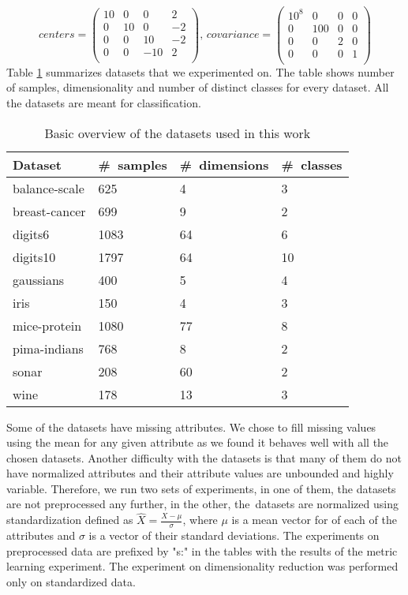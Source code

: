 \begin{equation} \label{eq:gauss}
centers = \begin{pmatrix}
10 & 0 & 0 & 2 \\
0 & 10 & 0 & -2 \\
0 & 0 & 10 & -2 \\
0 & 0 & -10 & 2 \\
\end{pmatrix}, \,
covariance = \begin{pmatrix}
10^8 & 0 & 0 & 0 \\
0 & 100 & 0 & 0 \\
0 & 0 & 2 & 0 \\
0 & 0 & 0 & 1 \\
\end{pmatrix}
\end{equation}
Table \ref{tab:datasets} summarizes datasets that we experimented on. The table shows number of samples, dimensionality and number of distinct classes for every dataset. All the datasets are meant for classification.

\begin{table}[t] \centering
\caption{Basic overview of the datasets used in this work} \label{tab:datasets}
\begin{tabular}{llll}
\toprule
Dataset & \#~samples & \#~dimensions & \#~classes \\
\midrule
balance-scale           & 625   & 4    & 3  \\
breast-cancer           & 699   & 9    & 2  \\
digits6                 & 1083  & 64   & 6  \\
digits10                & 1797  & 64  & 10 \\
gaussians               & 400   & 5   & 4  \\
iris                    & 150   & 4    & 3  \\
mice-protein            & 1080  & 77   & 8  \\
pima-indians            & 768   & 8    & 2  \\
sonar                   & 208   & 60   & 2  \\
wine                    & 178   & 13   & 3  \\
\bottomrule
\end{tabular}
\end{table}

Some of the datasets have missing attributes. We chose to fill missing values using the mean for any given attribute as we found it behaves well with all the chosen datasets. Another difficulty with the datasets is that many of them do not have normalized attributes and their attribute values are unbounded and highly variable. Therefore, we run two sets of experiments, in one of them, the datasets are not preprocessed any further, in the other, the~datasets are normalized using standardization defined as $\hat{X} = \frac{X-\mu}{\sigma}$, where $\mu$ is a mean vector for of each of the attributes and $\sigma$ is a vector of their standard deviations. The experiments on preprocessed data are prefixed by "s:" in the tables with the results of the metric learning experiment. The experiment on dimensionality reduction was performed only on standardized data.

